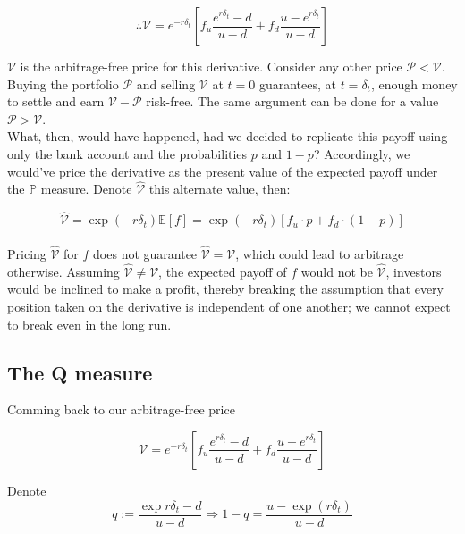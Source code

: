 \documentclass{article}
\begin{document}
\begin{equation} \label{eq:v_price_complete}
    \therefore \mathcal{V} = e^{-r\delta_t}\left[f_u \frac{e^{r\delta_t} - d}{u - d} + f_d \frac{u - e^{r\delta_t}}{u-d}\right]
\end{equation}

$\mathcal{V}$ is the arbitrage-free price for this derivative. Consider any other price $\mathcal{P} < \mathcal{V}$. Buying the portfolio $\mathcal{P}$ and selling $\mathcal{V}$ at $t=0$ guarantees, at $t=\delta_t$, enough money to settle and earn $\mathcal{V}-\mathcal{P}$ risk-free. The same argument can be done for a value $\mathcal{P} > \mathcal{V}$.\\

What, then, would have happened, had we decided to replicate this payoff using only the bank account and the probabilities $p$ and $1-p$? Accordingly, we would've price the derivative as the present value of the expected payoff under the $\mathbb{P}$ measure. Denote $\hat{\mathcal{V}}$ this alternate value, then:

\begin{equation}
    \hat{\mathcal{V}} = \exp(-r\delta_t)\mathbb{E}[f] = \exp(-r\delta_t)[f_u \cdot p + f_d \cdot (1- p) ]
\end{equation}\\


Pricing $\hat{\mathcal{V}}$ for $f$ does not guarantee $\hat{\mathcal{V}} = \mathcal{V}$, which could lead to arbitrage otherwise. Assuming $\hat{\mathcal{V}} \neq \mathcal{V}$, the expected payoff of $f$ would not be $\hat{\mathcal{V}}$, investors would be inclined to make a profit, thereby breaking the assumption that every position taken on the derivative is independent of one another; we cannot expect to break even in the long run.


\subsection{The \Bbb Q measure}
Comming back to our arbitrage-free price 

\begin{equation*}
    \mathcal{V} = e^{-r\delta_t}\left[f_u \frac{e^{r\delta_t} - d}{u - d} + f_d \frac{u - e^{r\delta_t}}{u-d}\right]
\end{equation*}

Denote
\begin{equation}
    q:= \frac{\exp{r\delta_t} - d}{u - d} \Longrightarrow 1-q = \frac{u - \exp{(r\delta_t)}}{u-d}
\end{equation}\\
\end{document}
